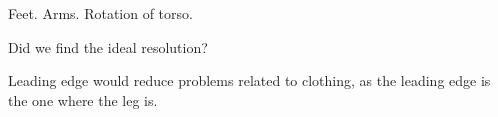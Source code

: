 Feet.
Arms.
Rotation of torso.

Did we find the ideal resolution?

\label{FutureWork:BaggyTrousers}
Leading edge would reduce problems related to clothing, as the leading edge is the one where the leg is.

